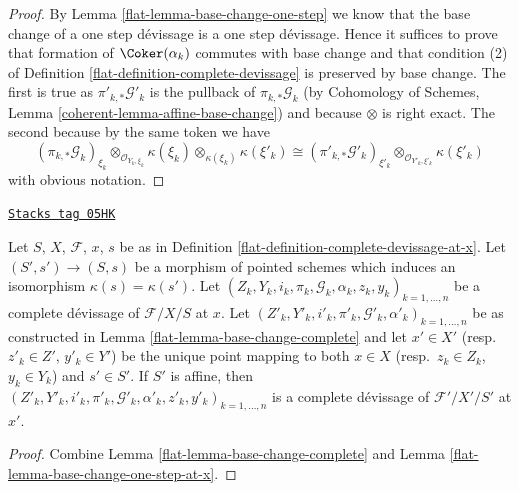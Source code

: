 \begin{proof}

By
Lemma \ref{flat-lemma-base-change-one-step}
we know that the base change of a one step d\'evissage is a one step
d\'evissage. Hence it suffices to prove that formation of
$\Coker(\alpha_k)$ commutes with base change and that
condition (2) of
Definition \ref{flat-definition-complete-devissage}
is preserved by base change. The first is true as
$\pi'_{k, *}\mathcal{G}'_k$ is the pullback of
$\pi_{k, *}\mathcal{G}_k$ (by
Cohomology of Schemes, Lemma \ref{coherent-lemma-affine-base-change})
and because $\otimes$ is right exact. The second because
by the same token we have
$$
(\pi_{k, *}\mathcal{G}_k)_{\xi_k}
\otimes_{\mathcal{O}_{Y_k, \xi_k}} \kappa(\xi_k)
\otimes_{\kappa(\xi_k)} \kappa(\xi'_k)
\cong
(\pi'_{k, *}\mathcal{G}'_k)_{\xi'_k}
\otimes_{\mathcal{O}_{Y'_k, \xi'_k}} \kappa(\xi'_k)
$$
with obvious notation.
\end{proof}

\begin{lemma}
\label{flat-lemma-base-change-complete-at-x}
\href{https://stacks.math.columbia.edu/tag/05HK}{\texttt{Stacks tag 05HK}}

Let $S$, $X$, $\mathcal{F}$, $x$, $s$ be as in
Definition \ref{flat-definition-complete-devissage-at-x}.
Let $(S', s') \to (S, s)$ be a morphism of pointed schemes
which induces an isomorphism $\kappa(s) = \kappa(s')$. Let
$(Z_k, Y_k, i_k, \pi_k, \mathcal{G}_k, \alpha_k, z_k, y_k)_{k = 1, \ldots, n}$
be a complete d\'evissage of $\mathcal{F}/X/S$ at $x$.
Let
$(Z'_k, Y'_k, i'_k, \pi'_k, \mathcal{G}'_k, \alpha'_k)_{k = 1, \ldots, n}$
be as constructed in
Lemma \ref{flat-lemma-base-change-complete}
and let $x' \in X'$ (resp.\ $z'_k \in Z'$, $y'_k \in Y'$) be the
unique point mapping to both $x \in X$ (resp.\ $z_k \in Z_k$, $y_k \in Y_k$)
and $s' \in S'$.
If $S'$ is affine, then
$(Z'_k, Y'_k, i'_k, \pi'_k, \mathcal{G}'_k, \alpha'_k,
z'_k, y'_k)_{k = 1, \ldots, n}$
is a complete d\'evissage of $\mathcal{F}'/X'/S'$ at $x'$.
\end{lemma}

\begin{proof}

Combine
Lemma \ref{flat-lemma-base-change-complete}
and
Lemma \ref{flat-lemma-base-change-one-step-at-x}.
\end{proof}

